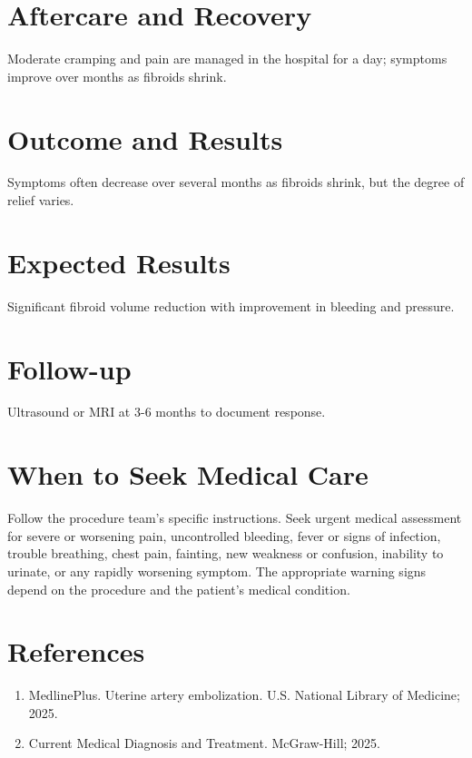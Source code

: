 \section*{Aftercare and Recovery}
Moderate cramping and pain are managed in the hospital for a day; symptoms improve over months as fibroids shrink.

\section*{Outcome and Results}
Symptoms often decrease over several months as fibroids shrink, but the degree of relief varies.

\section*{Expected Results}
Significant fibroid volume reduction with improvement in bleeding and pressure.

\section*{Follow-up}
Ultrasound or MRI at 3-6 months to document response.

\section*{When to Seek Medical Care}
Follow the procedure team's specific instructions. Seek urgent medical assessment for severe or worsening pain, uncontrolled bleeding, fever or signs of infection, trouble breathing, chest pain, fainting, new weakness or confusion, inability to urinate, or any rapidly worsening symptom. The appropriate warning signs depend on the procedure and the patient's medical condition.

\section*{References}
\begin{enumerate}
  \item MedlinePlus. Uterine artery embolization. U.S. National Library of Medicine; 2025.
  \item Current Medical Diagnosis and Treatment. McGraw-Hill; 2025.
\end{enumerate}

\clearpage
